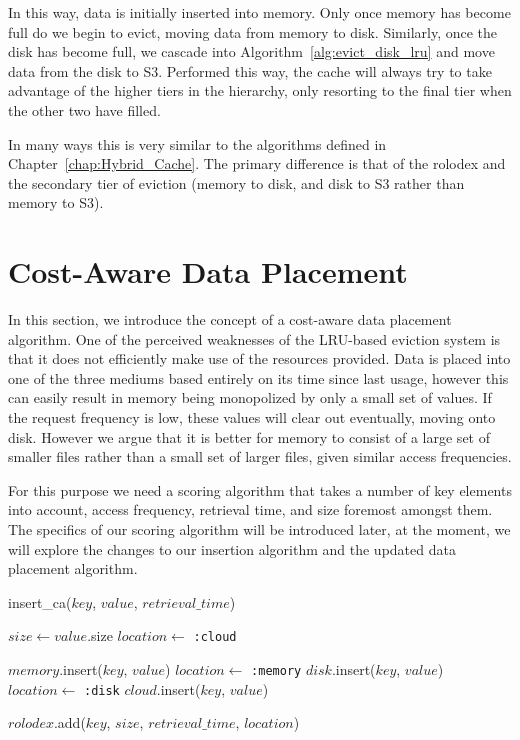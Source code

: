 In this way, data is initially inserted into memory. Only once memory has
become full do we begin to evict, moving data from memory to disk. Similarly,
once the disk has become full, we cascade into
Algorithm~\ref{alg:evict_disk_lru} and move data from the disk to S3. Performed
this way, the cache will always try to take advantage of the higher tiers in the
hierarchy, only resorting to the final tier when the other two have filled.

In many ways this is very similar to the algorithms defined in
Chapter~\ref{chap:Hybrid_Cache}. The primary difference is that of the rolodex
and the secondary tier of eviction (memory to disk, and disk to S3 rather than
memory to S3).

\section{Cost-Aware Data Placement} %
\label{sec:cost-aware}
In this section, we introduce the concept of a cost-aware data placement
algorithm. One of the perceived weaknesses of the LRU-based eviction system is
that it does not efficiently make use of the resources provided. Data is placed
into one of the three mediums based entirely on its time since last usage,
however this can easily result in memory being monopolized by only a small set
of values. If the request frequency is low, these values will clear out
eventually, moving onto disk. However we argue that it is better for memory to
consist of a large set of smaller files rather than a small set of larger
files, given similar access frequencies.

For this purpose we need a scoring algorithm that takes a number of key
elements into account, access frequency, retrieval time, and size foremost
amongst them. The specifics of our scoring algorithm will be introduced later,
at the moment, we will explore the changes to our insertion algorithm and the
updated data placement algorithm.

\begin{algorithm}[htp]
\small
\caption{\label{alg:insert_ca}insert\_ca($key$, $value$, $retrieval\_time$)}
\begin{algorithmic}[1]
\STATE $size \leftarrow value$.size
\STATE $location \leftarrow$ {\tt :cloud}

  \STATE $memory$.insert($key$, $value$)
	\STATE $location \leftarrow$ {\tt :memory}
	\STATE $disk$.insert($key$, $value$)
	\STATE $location \leftarrow$ {\tt :disk}
\ELSE
	\STATE $cloud$.insert($key$, $value$)
\ENDIF

\STATE $rolodex$.add($key$, $size$, $retrieval\_time$, $location$)
\end{algorithmic}
\end{algorithm}

